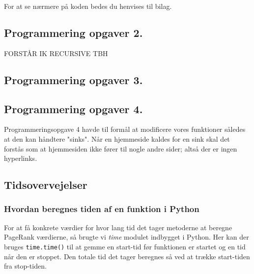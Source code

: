 For at se nærmere på koden bedes du henvises til bilag.

\subsection*{Programmering opgaver 2.}

FORSTÅR IK RECURSIVE TBH

\subsection*{Programmering opgaver 3.}


\subsection*{Programmering opgaver 4.}
Programmeringsopgave 4 havde til formål at modificere vores funktioner således at den kan håndtere "sinks". Når en hjemmeside kaldes for en sink skal det forstås som at hjemmesiden ikke fører til nogle andre sider; altså der er ingen hyperlinks.

\subsection*{Tidsovervejelser}
\subsubsection*{Hvordan beregnes tiden af en funktion i Python}
For at få konkrete værdier for hvor lang tid det tager metoderne at beregne PageRank værdierne, så brugte vi \emph{time} modulet indbygget i Python. Her kan der bruges \texttt{time.time()} til at gemme en start-tid før funktionen er startet og en tid når den er stoppet. Den totale tid det tager beregnes så ved at trække start-tiden fra stop-tiden.

